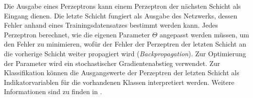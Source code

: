 Die Ausgabe eines Perzeptrons kann einem Perzeptron der nächsten Schicht als Eingang dienen. Die letzte Schicht fungiert als Ausgabe des Netzwerks, dessen Fehler anhand eines Trainingsdatensatzes bestimmt werden kann. Jedes Perzeptron berechnet, wie die eigenen Parameter $\Theta$ angepasst werden müssen, um den Fehler zu minimieren, wofür der Fehler der Perzeptren der letzten Schicht an die vorherige Schicht weiter propagiert wird (\textit{Backpropagation}). Zur Optimierung der Parameter wird ein stochastischer Gradientenabstieg verwendet. Zur Klassifikation können die Ausgangswerte der Perzeptren der letzten Schicht als Indikatorvariablen für die vorhandenen Klassen interpretiert werden. Weitere Informationen sind zu finden in \cite{Haykin1994}.